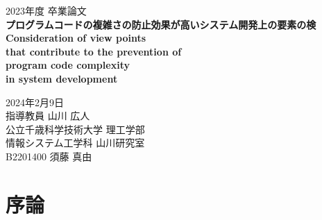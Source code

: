 \documentclass[12pt, a4paper]{jreport}
\begin{document}
    \thispagestyle{empty}
    \begin{center}

        \vspace{20mm}
        {\Large\noindent 2023年度 卒業論文}\\
        \vspace{40mm}
        {\huge\noindent\textbf{プログラムコードの複雑さの防止効果が高いシステム開発上の要素の検}}\\
        \medskip
        \vspace{\baselineskip}
        {\LARGE\noindent\textbf{Consideration of view points}}\\
        \medskip
        {\LARGE\noindent\textbf{that contribute to the prevention of}}\\
        \medskip
        {\LARGE\noindent\textbf{program code complexity}}\\
        \medskip
        {\LARGE\noindent\textbf{in system development}}\\
        \vspace{40mm}

        {\Large\noindent
        2024年2月9日\\
        \vspace{\baselineskip}
        指導教員 山川 広人   \\
        \vspace{\baselineskip}
        公立千歳科学技術大学 理工学部\\
        情報システム工学科 山川研究室\\
        \vspace{\baselineskip}
        B2201400 須藤 真由 \\
        }
        \vspace{40mm}

    \end{center}
    \tableofcontents
    \chapter{序論}
\end{document}
